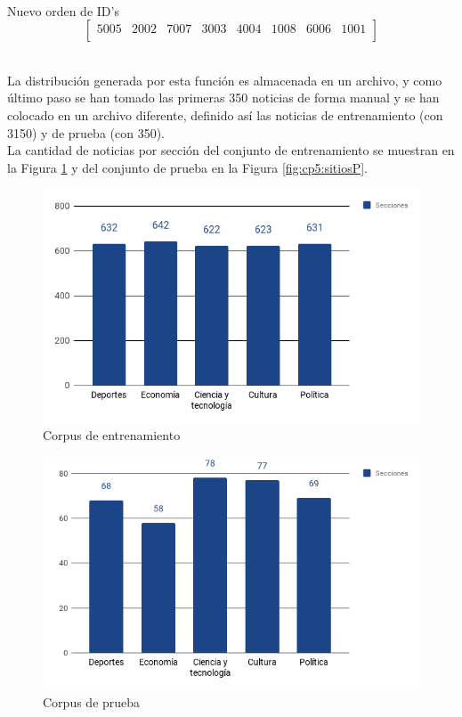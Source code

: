 \ \\


\begin{mygraybox}[label={box:cp5:shuffle}]{Nuevo orden de ID's} 
\begin{equation*}
\begin{bmatrix}
5005 & 2002 & 7007 & 3003 & 4004 & 1008 & 6006 & 1001\\
\end{bmatrix}
\end{equation*}
\end{mygraybox}
\ \\

La distribución generada por esta función es almacenada en un archivo, y como último paso se han tomado las primeras 350 noticias de forma manual y se han colocado en un archivo diferente, definido así las noticias de entrenamiento (con 3150) y de prueba (con 350).\\

La cantidad de noticias por sección del conjunto de entrenamiento se muestran en la Figura \ref{fig:cp5:seccionE} y del conjunto de prueba en la Figura \ref{fig:cp5:sitiosP}.



\begin{figure}[h]
\centering
\includegraphics[scale=.6]{imagenes/capitulo5/SeccionesE.png}
\caption{Corpus de entrenamiento}
\label{fig:cp5:seccionE}
\end{figure}

\begin{figure}[H]
\centering
\includegraphics[scale=.6]{imagenes/capitulo5/SeccionesP.png}
\caption{Corpus de prueba}
\label{fig:cp5:seccionP}
\end{figure}

